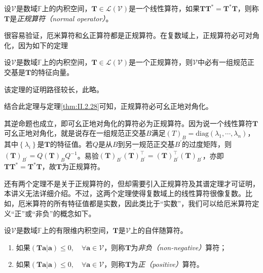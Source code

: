 \documentclass[main.tex]{subfiles}
\begin{document}
\begin{definition}[正规算符]\label{def:II.2.24}
    设$\mathcal{V}$是数域$\mathbb{F}$上的内积空间，$\mathbf{T}\in\mathcal{L}\left(\mathcal{V}\right)$是一个线性算符，如果$\mathbf{TT}^*=\mathbf{T}^*\mathbf{T}$，则称$\mathbf{T}$是\emph{正规算符（normal operator）}。
\end{definition}

很容易验证，厄米算符和幺正算符都是正规算符。在复数域上，正规算符必可对角化，因为如下的定理

\begin{theorem}\label{thm:II.2.35}
    设$\mathcal{V}$是数域$\mathbb{F}$上的内积空间，$\mathbf{T}\in\mathcal{L}\left(\mathcal{V}\right)$是一个正规算符，则$\mathcal{V}$中必有一组规范正交基是$\mathbf{T}$的特征向量。
\end{theorem}

该定理的证明路径较长，此略\cite[\S 8.5 Theorem 22]{Hoffman1971}。

结合此定理与定理\ref{thm:II.2.28}可知，正规算符必可幺正地对角化。

其逆命题也成立，即可幺正地对角化的算符必为正规算符。因为说一个线性算符$\mathbf{T}$可幺正地对角化，就是说存在一组规范正交基$B$满足$\left(T\right)_B=\mathrm{diag}\left(\lambda_1,\cdots,\lambda_n\right)$，其中$\left\{\lambda_i\right\}$是$\mathbf{T}$的特征值。若$Q$是从$B$到另一规范正交基$B^\prime$的过度矩阵，则$\left(\mathbf{T}\right)_{B^\prime}=Q\left(\mathbf{T}\right)_{B}Q^{-1}$。易验$\left(\mathbf{T}\right)_{B^\prime}\overline{\left(\mathbf{T}\right)^\intercal_{B^\prime}}=\overline{\left(\mathbf{T}\right)^\intercal_{B^\prime}}\left(\mathbf{T}\right)_{B^\prime}$，亦即$\mathbf{TT}^*=\mathbf{T}^*\mathbf{T}$，故$\mathbf{T}$为正规算符。

还有两个定理不是关于正规算符的，但却需要引入正规算符及其谱定理才可证明，本讲义无法详细介绍。不过，这两个定理使得复数域上的线性算符很像复数。比如，厄米算符的所有特征值都是实数，因此类比于“实数”，我们可以给厄米算符定义“正”或“非负”的概念如下。

\begin{definition}\label{def:II.2.25}
    设$\mathcal{V}$是数域$\mathbb{F}$上的有限维内积空间，$\mathbf{T}$是$\mathcal{V}$上的自伴随算符。
    \begin{enumerate}
        \item 如果$\left(\mathbf{Ta}|\mathbf{a}\right)\leq 0,\quad\forall\mathbf{a}\in\mathcal{V}$，则称$\mathbf{T}$为\emph{非负（non-negative）}算符；
        \item 如果$\left(\mathbf{Ta}|\mathbf{a}\right)\leq 0,\quad\forall\mathbf{a}\in\mathcal{V}$，则称$\mathbf{T}$为\emph{正（positive）}算符。
    \end{enumerate}
\end{definition}
\end{document}
